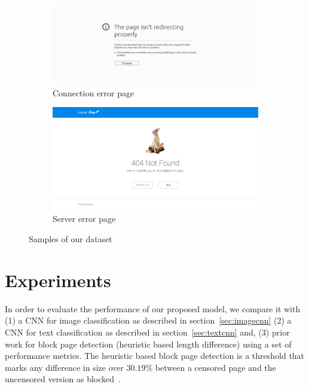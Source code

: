 \documentclass{article} %
\begin{document}
\begin{figure}
\begin{subfigure}[b]{0.2\textwidth}
        \centering
        \includegraphics[width=\textwidth]{connectionerr.png}
        \caption{Connection error page}
        \label{fig:connectionerror}
    \end{subfigure}
    \hfill
    \begin{subfigure}[b]{0.2\textwidth}
        \centering
        \includegraphics[width=\textwidth]{servererr.png}
        \caption{Server error page}
        \label{fig:servererror}
    \end{subfigure}
    \caption{Samples of our dataset}
    \label{fig:sample_dataset}
\end{figure}
\section{Experiments}
\label{experiments}
In order to evaluate the performance of our proposed model, we compare it with (1) a CNN for image classification as described in section~\ref{sec:imagecnn} (2) a CNN for text classification as described in section~\ref{sec:textcnn} and, (3) prior work for block page detection (heuristic based length difference) using a set of performance metrics. The heuristic based block page detection is a threshold that marks any difference in size over $30.19\%$ between a censored page and the uncensored version as blocked~\cite{imc14_phillipa}.
\end{document}
